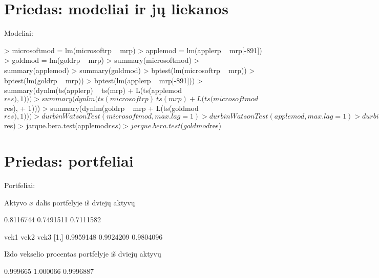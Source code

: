 \documentclass[12pt, a14paper, lithuanian]{article}
\begin{document}
\section{Priedas: modeliai ir jų liekanos}
\label{B 1}
Modeliai:
\begin{Schunk}
\begin{Sinput}
> microsoftmod = lm(microsoftrp ~ mrp)
> applemod = lm(applerp ~ mrp[-891])
> goldmod = lm(goldrp ~ mrp)
> summary(microsoftmod)
> summary(applemod)
> summary(goldmod)
> bptest(lm(microsoftrp ~ mrp))
> bptest(lm(goldrp ~ mrp))
> bptest(lm(applerp ~ mrp[-891]))
> summary(dynlm(ts(applerp) ~ ts(mrp) + L(ts(applemod$res), 1)))
> summary(dynlm(ts(microsoftrp) ~ ts(mrp) + L(ts(microsoftmod$res), 
+     1)))
> summary(dynlm(goldrp ~ mrp + L(ts(goldmod$res), 1)))
> durbinWatsonTest(microsoftmod, max.lag = 1)
> durbinWatsonTest(applemod, max.lag = 1)
> durbinWatsonTest(goldmod, max.lag = 1)
> jarque.bera.test(microsoftmod$res)
> jarque.bera.test(applemod$res)
> jarque.bera.test(goldmod$res)
\end{Sinput}
\end{Schunk}

\section{Priedas: portfeliai}
Portfeliai:


\label{C1}
 Aktyvo $x$ dalis portfelyje iš dviejų aktyvų

\begin{Schunk}
\begin{Soutput}
          [,1]      [,2]      [,3]
[1,] 0.8116744 0.7491511 0.7111582
\end{Soutput}
\end{Schunk}

\begin{Schunk}
\begin{Soutput}
          vek1      vek2      vek3
[1,] 0.9959148 0.9924209 0.9804096
\end{Soutput}
\end{Schunk}

 Iždo vekselio procentas portfelyje iš dviejų aktyvų 

\begin{Schunk}
\begin{Soutput}
         [,1]     [,2]      [,3]
[1,] 0.999665 1.000066 0.9996887
\end{Soutput}
\end{Schunk}
\end{document}
